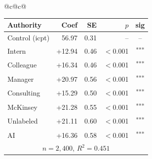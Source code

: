 \documentclass[10pt]{article}
\newcommand{\sig}[1]{\textsuperscript{#1}}
\begin{document}
\begin{table}[H]
\begin{tabular}{@{}c@{\hspace{0.5em}}c@{}}
\begin{minipage}[t]{0.49\textwidth}
\begin{tabular}{@{}l r r r c@{}}
\toprule
Authority & Coef & SE & $p$ & sig \\
\midrule
\cellcolor{gray!22}Control (icpt) & \cellcolor{gray!22}56.97 & \cellcolor{gray!22}0.31 & \cellcolor{gray!22}-- & \cellcolor{gray!22}-- \\
\midrule
Intern & +12.94 & 0.46 & $<$0.001 & \sig{***} \\
Colleague & +16.34 & 0.46 & $<$0.001 & \sig{***} \\
Manager & +20.97 & 0.56 & $<$0.001 & \sig{***} \\
\midrule
Consulting & +15.29 & 0.50 & $<$0.001 & \sig{***} \\
McKinsey & +21.28 & 0.55 & $<$0.001 & \sig{***} \\
\midrule
Unlabeled & +21.11 & 0.60 & $<$0.001 & \sig{***} \\
AI & +16.36 & 0.58 & $<$0.001 & \sig{***} \\
\midrule
\multicolumn{5}{c}{\scriptsize $n=2{,}400$, $R^2=0.451$} \\
\bottomrule\end{tabular}
\end{minipage} \\
\end{tabular}
\end{table}
\end{document}
